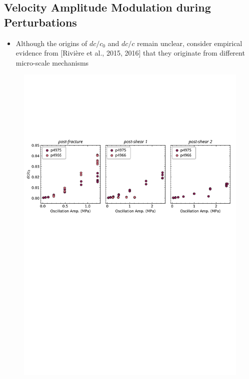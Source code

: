 \documentclass[letterpaper,10pt]{article}
\begin{document}
\newpage


\subsection{Velocity Amplitude Modulation during Perturbations}
\begin{itemize}
	\item Although the origins of $dc/c_0 $ and $ dc/c $ remain unclear, consider empirical evidence from [Rivière et al., 2015, 2016] that they originate from different micro-scale mechanisms 
\end{itemize}


\begin{figure}[ht]
	\centering
	\includegraphics[width=1\columnwidth]{Dc_NS_amp}

\end{figure}
\end{document}

